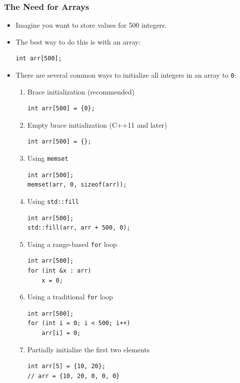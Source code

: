 \documentclass[10pt]{article}
\begin{document}
\subsubsection{The Need for Arrays}
\begin{itemize}
	\item Imagine you want to store values for 500 integers.
	\item The best way to do this is with an array:
		\begin{verbatim}
int arr[500];
		\end{verbatim}

	\item There are several common ways to initialize all integers in an array to \texttt{0}:

		\begin{enumerate}
			\item Brace initialization (recommended)
			\begin{verbatim}
int arr[500] = {0};
			\end{verbatim}

			\item Empty brace initialization (C++11 and later)
			\begin{verbatim}
int arr[500] = {};
			\end{verbatim}

			\item Using \texttt{memset}
			\begin{verbatim}
int arr[500];
memset(arr, 0, sizeof(arr));
			\end{verbatim}

			\item Using \texttt{std::fill}
			\begin{verbatim}
int arr[500];
std::fill(arr, arr + 500, 0);
			\end{verbatim}

			\item Using a range-based \texttt{for} loop
			\begin{verbatim}
int arr[500];
for (int &x : arr)
    x = 0;
			\end{verbatim}

			\item Using a traditional \texttt{for} loop
			\begin{verbatim}
int arr[500];
for (int i = 0; i < 500; i++)
    arr[i] = 0;
			\end{verbatim}

    \item Partially initialize the first two elements
    \begin{verbatim}
int arr[5] = {10, 20};
// arr = {10, 20, 0, 0, 0}
    \end{verbatim}
		\end{enumerate}


\end{itemize}
\end{document}
